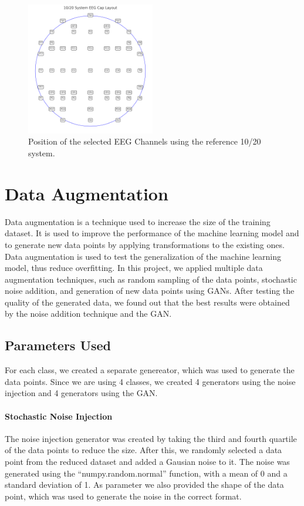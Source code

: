 \begin{figure}[!htbp]
    \centering
    \includegraphics[width=0.5\textwidth]{Figures/Methodology/thesis_eeg_cap}
    \caption{Position of the selected EEG Channels using the reference 10/20 system.}
    \label{fig:eeg_channels}
\end{figure}

\section{Data Augmentation}
Data augmentation is a technique used to increase the size of the training dataset.
It is used to improve the performance of the machine learning model and to generate new data points by applying transformations to the existing ones.
Data augmentation is used to test the generalization of the machine learning model, thus reduce overfitting.
In this project, we applied multiple data augmentation techniques, such as random sampling of the data points, stochastic noise addition, and generation of new data points using GANs.
After testing the quality of the generated data, we found out that the best results were obtained by the noise addition technique and the GAN.

\subsection*{Parameters Used}
For each class, we created a separate genereator, which was used to generate the data points.
Since we are using 4 classes, we created 4 generators using the noise injection and 4 generators using the GAN.
\paragraph*{Stochastic Noise Injection}
The noise injection generator was created by taking the third and fourth quartile of the data points to reduce the size.
After this, we randomly selected a data point from the reduced dataset and added a Gausian noise to it.
The noise was generated using the ``numpy.random.normal'' function, with a mean of 0 and a standard deviation of 1.
As parameter we also provided the shape of the data point, which was used to generate the noise in the correct format.

